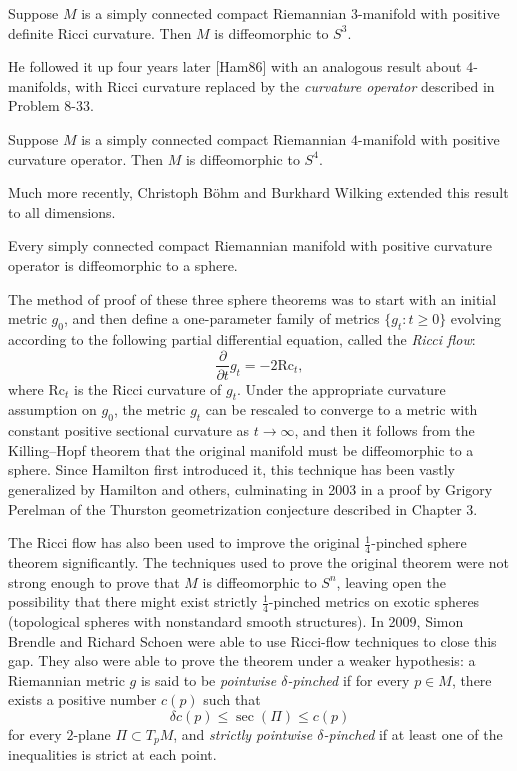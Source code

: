 \begin{theorem}
\label{thm:hamilton-3-manifold}
Suppose $M$ is a simply connected compact Riemannian $3$-manifold with positive definite Ricci curvature. Then $M$ is diffeomorphic to $S^3$.
\end{theorem}

He followed it up four years later [Ham86] with an analogous result about $4$-manifolds, with Ricci curvature replaced by the \textit{curvature operator} described in Problem 8-33.

\begin{theorem}
\label{thm:hamilton-4-manifold}
Suppose $M$ is a simply connected compact Riemannian $4$-manifold with positive curvature operator. Then $M$ is diffeomorphic to $S^4$.
\end{theorem}

Much more recently, Christoph Böhm and Burkhard Wilking \cite{BW08} extended this result to all dimensions.

\begin{theorem}
\label{thm:bohm-wilking}
Every simply connected compact Riemannian manifold with positive curvature operator is diffeomorphic to a sphere.
\end{theorem}

The method of proof of these three sphere theorems was to start with an initial metric $g_0$, and then define a one-parameter family of metrics $\{g_t : t \geq 0\}$ evolving according to the following partial differential equation, called the \emph{Ricci flow}:
\[
\frac{\partial}{\partial t} g_t = -2 \text{Rc}_t,
\]
where $\text{Rc}_t$ is the Ricci curvature of $g_t$. Under the appropriate curvature assumption on $g_0$, the metric $g_t$ can be rescaled to converge to a metric with constant positive sectional curvature as $t \to \infty$, and then it follows from the Killing--Hopf theorem that the original manifold must be diffeomorphic to a sphere. Since Hamilton first introduced it, this technique has been vastly generalized by Hamilton and others, culminating in 2003 in a proof by Grigory Perelman of the Thurston geometrization conjecture described in Chapter 3.

The Ricci flow has also been used to improve the original $\frac{1}{4}$-pinched sphere theorem significantly. The techniques used to prove the original theorem were not strong enough to prove that $M$ is diffeomorphic to $S^n$, leaving open the possibility that there might exist strictly $\frac{1}{4}$-pinched metrics on exotic spheres (topological spheres with nonstandard smooth structures). In 2009, Simon Brendle and Richard Schoen \cite{BS09} were able to use Ricci-flow techniques to close this gap. They also were able to prove the theorem under a weaker hypothesis: a Riemannian metric $g$ is said to be \emph{pointwise $\delta$-pinched} if for every $p \in M$, there exists a positive number $c(p)$ such that
\[
\delta c(p) \leq \sec(\Pi) \leq c(p)
\]
for every $2$-plane $\Pi \subset T_p M$, and \emph{strictly pointwise $\delta$-pinched} if at least one of the inequalities is strict at each point.

